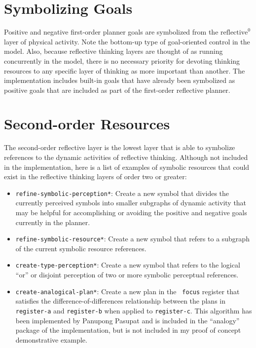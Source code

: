 \section{Symbolizing Goals}

Positive and negative first-order planner goals are symbolized from
the $\text{reflective}^0$ layer of physical activity.  Note the
bottom-up type of goal-oriented control in the model.  Also, because
reflective thinking layers are thought of as running concurrently in
the model, there is no necessary priority for devoting thinking
resources to any specific layer of thinking as more important than
another.  The implementation includes built-in goals that have already
been symbolized as positive goals that are included as part of the
first-order reflective planner.

\section{Second-order Resources}

The second-order reflective layer is the lowest layer that is able to
symbolize references to the dynamic activities of reflective thinking.
Although not included in the implementation, here is a list of
examples of symbolic resources that could exist in the reflective
thinking layers of order two or greater:
\begin{itemize}
\item {\tt refine-symbolic-perception*}: Create a new symbol that
  divides the currently perceived symbols into smaller subgraphs of
  dynamic activity that may be helpful for accomplishing or avoiding
  the positive and negative goals currently in the planner.
\item {\tt refine-symbolic-resource*}: Create a new symbol that refers
  to a subgraph of the current symbolic resource references.
\item {\tt create-type-perception*}: Create a new symbol that refers
  to the logical ``or'' or disjoint perception of two or more symbolic
  perceptual references.
\item {\tt create-analogical-plan*}: Create a new plan in the {\tt
  focus} register that satisfies the \cite{winston:1970}
  difference-of-differences relationship between the plans in {\tt
    register-a} and {\tt register-b} when applied to {\tt register-c}.
  This algorithm has been implemented by Panupong Pasupat and is
  included in the ``analogy'' package of the implementation, but is
  not included in my proof of concept demonstrative example.
\end{itemize}

